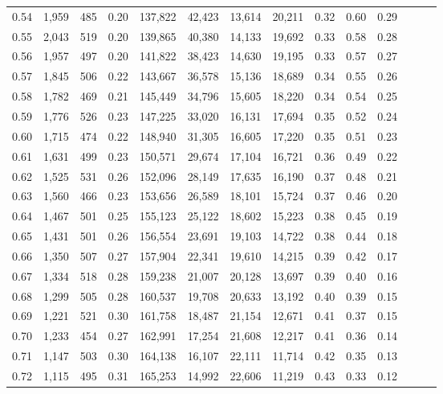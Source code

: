 \begin{tabular}{rrrrrrrrrrrrrr}
0.54 &  1,959 &  485 &  0.20 &  137,822 &   42,423 &  13,614 &  20,211 &  0.32 &  0.60 &      0.29 \\
0.55 &  2,043 &  519 &  0.20 &  139,865 &   40,380 &  14,133 &  19,692 &  0.33 &  0.58 &      0.28 \\
0.56 &  1,957 &  497 &  0.20 &  141,822 &   38,423 &  14,630 &  19,195 &  0.33 &  0.57 &      0.27 \\
0.57 &  1,845 &  506 &  0.22 &  143,667 &   36,578 &  15,136 &  18,689 &  0.34 &  0.55 &      0.26 \\
0.58 &  1,782 &  469 &  0.21 &  145,449 &   34,796 &  15,605 &  18,220 &  0.34 &  0.54 &      0.25 \\
0.59 &  1,776 &  526 &  0.23 &  147,225 &   33,020 &  16,131 &  17,694 &  0.35 &  0.52 &      0.24 \\
0.60 &  1,715 &  474 &  0.22 &  148,940 &   31,305 &  16,605 &  17,220 &  0.35 &  0.51 &      0.23 \\
0.61 &  1,631 &  499 &  0.23 &  150,571 &   29,674 &  17,104 &  16,721 &  0.36 &  0.49 &      0.22 \\
0.62 &  1,525 &  531 &  0.26 &  152,096 &   28,149 &  17,635 &  16,190 &  0.37 &  0.48 &      0.21 \\
0.63 &  1,560 &  466 &  0.23 &  153,656 &   26,589 &  18,101 &  15,724 &  0.37 &  0.46 &      0.20 \\
0.64 &  1,467 &  501 &  0.25 &  155,123 &   25,122 &  18,602 &  15,223 &  0.38 &  0.45 &      0.19 \\
0.65 &  1,431 &  501 &  0.26 &  156,554 &   23,691 &  19,103 &  14,722 &  0.38 &  0.44 &      0.18 \\
0.66 &  1,350 &  507 &  0.27 &  157,904 &   22,341 &  19,610 &  14,215 &  0.39 &  0.42 &      0.17 \\
0.67 &  1,334 &  518 &  0.28 &  159,238 &   21,007 &  20,128 &  13,697 &  0.39 &  0.40 &      0.16 \\
0.68 &  1,299 &  505 &  0.28 &  160,537 &   19,708 &  20,633 &  13,192 &  0.40 &  0.39 &      0.15 \\
0.69 &  1,221 &  521 &  0.30 &  161,758 &   18,487 &  21,154 &  12,671 &  0.41 &  0.37 &      0.15 \\
0.70 &  1,233 &  454 &  0.27 &  162,991 &   17,254 &  21,608 &  12,217 &  0.41 &  0.36 &      0.14 \\
0.71 &  1,147 &  503 &  0.30 &  164,138 &   16,107 &  22,111 &  11,714 &  0.42 &  0.35 &      0.13 \\
0.72 &  1,115 &  495 &  0.31 &  165,253 &   14,992 &  22,606 &  11,219 &  0.43 &  0.33 &      0.12 \\

\end{tabular}
